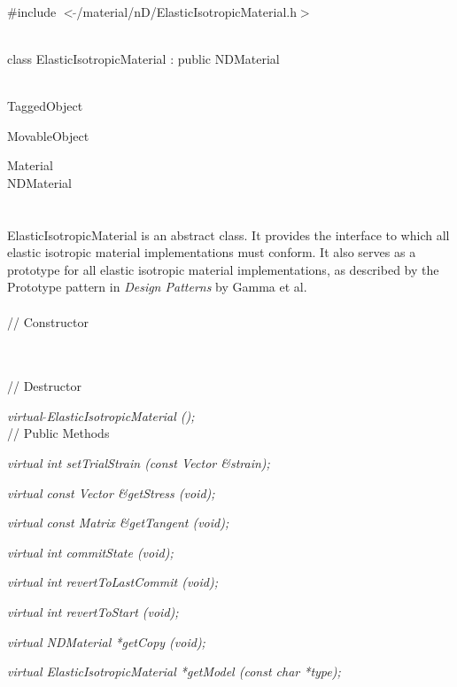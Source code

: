 
   \\
\#include $<\tilde{ }$/material/nD/ElasticIsotropicMaterial.h$>$  


  \\
class ElasticIsotropicMaterial : public NDMaterial 


 \\
TaggedObject 

MovableObject 

\indent\indent Material \\
\indent\indent\indent NDMaterial \\
\indent\indent\indent{} \\

  \\
ElasticIsotropicMaterial is an abstract class.  It provides the
interface to which all elastic isotropic material implementations
must conform.  It also serves as a prototype for all elastic isotropic
material implementations, as described by the Prototype pattern in
{\em Design Patterns} by Gamma et al. \\

 \\
// Constructor 

  \\ \\
// Destructor 

{\em virtual $\tilde{ }$ElasticIsotropicMaterial ();}\\ 

// Public Methods 

{\em virtual int setTrialStrain (const Vector \&strain); } 

{\em virtual const Vector \&getStress (void); } 

{\em virtual const Matrix \&getTangent (void); } 

{\em virtual int commitState (void); } 

{\em virtual int revertToLastCommit (void); } 

{\em virtual int revertToStart (void); } 

{\em virtual NDMaterial *getCopy (void); } 

{\em virtual ElasticIsotropicMaterial *getModel (const char *type); } 


